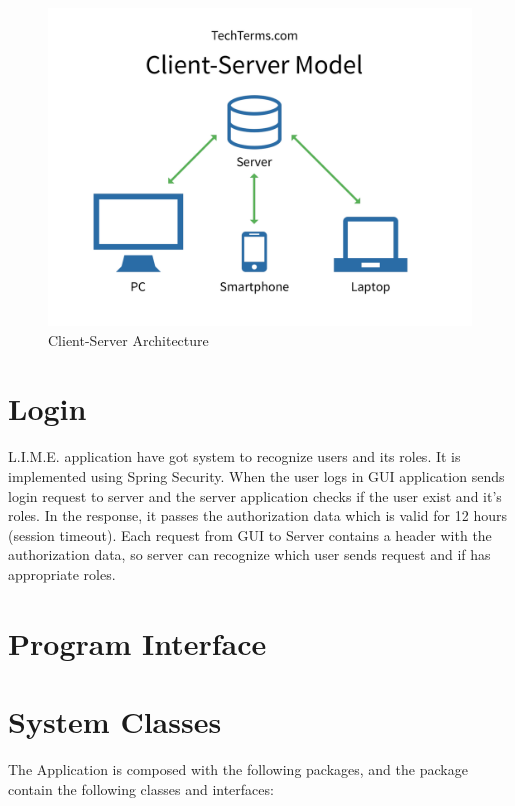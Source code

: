 \documentclass[a4paper,11pt,twoside]{report}
\theoremstyle{definition}
\begin{document}
\begin{figure}[h]

\begin{center}

\includegraphics[width=\textwidth]{CS}

\end{center}
\caption{Client-Server Architecture}
\end{figure}

\section{Login}
 L.I.M.E. application have got system to recognize users and its roles. It is implemented using Spring Security. When the user logs in GUI application sends login request to server and the server application checks if the user exist and it’s roles. In the response, it passes the authorization data which is valid for 12 hours (session timeout). Each request from GUI to Server contains a header with the authorization data, so server can recognize which user sends request and if has appropriate roles.
\section{Program Interface}


\section{System Classes}

The Application is composed with the following packages, and the package contain the following classes and interfaces:
\end{document}
